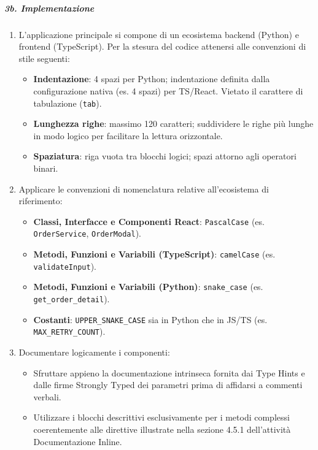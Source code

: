\documentclass[a4paper, 11pt, oneside]{scrartcl}
\begin{document}
\subparagraph{3b. Implementazione}
\begin{enumerate}
    \item L'applicazione principale si compone di un ecosistema backend (Python) e frontend (TypeScript). Per la stesura del codice attenersi alle convenzioni di stile seguenti:
          \begin{itemize}
              \item \textbf{Indentazione}: 4 spazi per Python; indentazione definita dalla configurazione nativa (es. 4 spazi) per TS/React. Vietato il carattere di tabulazione (\texttt{tab}).
              \item \textbf{Lunghezza righe}: massimo 120 caratteri; suddividere le righe più lunghe in modo logico per facilitare la lettura orizzontale.
              \item \textbf{Spaziatura}: riga vuota tra blocchi logici; spazi attorno agli operatori binari.
          \end{itemize}
    \item Applicare le convenzioni di nomenclatura relative all'ecosistema di riferimento:
          \begin{itemize}
              \item \textbf{Classi, Interfacce e Componenti React}: \texttt{PascalCase}{\scriptsize{}} (es. \texttt{OrderService}, \texttt{OrderModal}).
              \item \textbf{Metodi, Funzioni e Variabili (TypeScript)}: \texttt{camelCase}{\scriptsize{}} (es. \texttt{validateInput}).
              \item \textbf{Metodi, Funzioni e Variabili (Python)}: \texttt{snake\_case}{\scriptsize{}} (es. \texttt{get\_order\_detail}).
              \item \textbf{Costanti}: \texttt{UPPER\_SNAKE\_CASE} sia in Python che in JS/TS (es. \texttt{MAX\_RETRY\_COUNT}).
          \end{itemize}
    \item Documentare logicamente i componenti:
          \begin{itemize}
              \item Sfruttare appieno la documentazione intrinseca fornita dai Type Hints e dalle firme Strongly Typed dei parametri prima di affidarsi a commenti verbali.
              \item Utilizzare i blocchi descrittivi esclusivamente per i metodi complessi coerentemente alle direttive illustrate nella sezione 4.5.1 dell'attività Documentazione Inline.

\end{itemize}
\end{enumerate}
\end{document}
